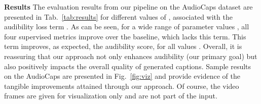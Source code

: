 \documentclass{article}
\begin{document}
\begin{table}[h]
\centering
{}
\caption{Evaluation results on the AudioCaps dataset for varying values of the weight parameter . The table displays several performance metrics, including BLEU (B), METEOR (M), ROUGE-L (R), and CIDEr (C), alongside a novel metric focused on audibility (A).}
\label{tab:results}
\vspace{-5mm}
\end{table}

\noindent\textbf{Results\quad}
The evaluation results from our pipeline on the AudioCaps dataset are presented in Tab.~\ref{tab:results} for different values of , associated with the audibility loss term . As can be seen, for a wide range of parameter values , all four supervised metrics improve over the  baseline, which lacks this term. This term improves, as expected, the audibility score, for all values . Overall, it is reassuring that our approach not only enhances audibility (our primary goal) but also positively impacts the overall quality of generated captions.
Sample results on the AudioCaps are presented in Fig.~\ref{fig:viz} and provide evidence of the tangible improvements attained through our approach. Of course, the video frames are given for visualization only and are not part of the input.
\end{document}
